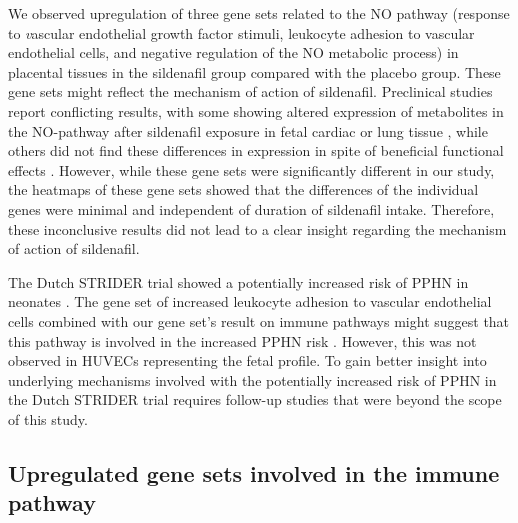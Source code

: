 \documentclass[authordate, empirical]{jote-new-article}
\begin{document}
	We observed upregulation of three gene sets related to the NO pathway (response to \emph{v}ascular endothelial growth factor stimuli, leukocyte adhesion to vascular endothelial cells, and negative regulation of the NO metabolic process) in placental tissues in the sildenafil group compared with the placebo group. These gene sets might reflect the mechanism of action of sildenafil. Preclinical studies report conflicting results, with some showing altered expression of metabolites in the NO-pathway after sildenafil exposure in fetal cardiac or lung tissue \parencites{Itani2017}{Shue2014}, while others did not find these differences in expression in spite of beneficial functional effects \parencites{George2013}. However, while these gene sets were significantly different in our study, the heatmaps of these gene sets showed that the differences of the individual genes were minimal and independent of duration of sildenafil intake. Therefore, these inconclusive results did not lead to a clear insight regarding the mechanism of action of sildenafil.



	The Dutch STRIDER trial showed a potentially increased risk of PPHN in neonates \parencites{Pels2020}. The gene set of increased leukocyte adhesion to vascular endothelial cells combined with our gene set's result on immune pathways might suggest that this pathway is involved in the increased PPHN risk \parencites{Rafikov2019}{Kuebler2018}{Chami2012}{Kobayashi2004}. However, this was not observed in HUVECs representing the fetal profile. To gain better insight into underlying mechanisms involved with the potentially increased risk of PPHN in the Dutch STRIDER trial requires follow-up studies that were beyond the scope of this study.







	\subsection{Upregulated gene sets involved in the immune pathway }
\end{document}
